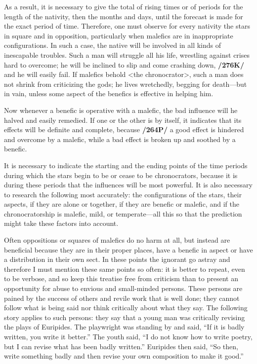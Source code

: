 As a result, it is necessary to give the total of rising times or of periods for the length of the nativity, then the months and days, until the forecast is made for the exact period of time. \mndl Therefore, one must observe for every nativity the stars in square and in opposition, particularly when malefics are in inappropriate configurations. In such a case, the native will be involved in all kinds of inescapable troubles. Such a man will struggle all his life, wrestling against crises hard to overcome; he will be inclined to slip and come crashing down, \textbf{/276K/} and he will easily fail. If malefics behold <the chronocrator>, such a man does not shrink from criticizing the gods; he lives wretchedly, begging for death—but in vain, unless some aspect of the benefics is effective in helping him. 

Now \mndl whenever a benefic is operative with a malefic, the bad influence will he halved and easily remedied. If one or the other is by itself, it indicates that its effects will be definite and complete, because \textbf{/264P/} a good effect is hindered and overcome by a malefic, while a bad effect is broken up and soothed by a benefic.

It  is necessary to indicate the starting and the ending points of the time periods during which the stars begin to be or cease to be chronocrators, because it is during these periods that the influences will be most powerful. It is also necessary to research the following most accurately: the configurations of the stars, their aspects, if they are alone or together, if they are benefic or malefic, and if the chronocratorship is malefic, mild, or temperate—all this so that the prediction might take these factors into account. 

 
Often \mnmb oppositions or squares of malefics do no harm at all, but instead are beneficial because they are in their proper places, have a benefic in aspect or have a distribution in their own sect. In these points the ignorant go astray and therefore I must mention these same points so often: it is better to repeat, even to be verbose, and so keep this treatise free from criticism than to present an opportunity for abuse to envious and small-minded persons. These persons are pained by the success of others and revile work that is well done; they cannot follow what is being said nor think critically about what they say. The following story applies to such persons: they say that a young man was critically
revising the plays of Euripides. The playwright was standing by and said, “If it is badly written, you write it better.” The youth said, “I do not know how to write poetry, but I can revise what has been badly
written.” Euripides then said, “So then, write something badly and then revise your own composition to make it good.” 

